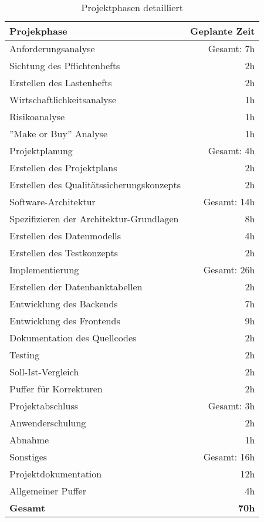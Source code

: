 \label{app:projektphasen_detail}
\begin{table}[H]
	\centering
	\begin{tabular}{lr}

		\rowcolor{white!15}				
		\textbf{Projekphase} & \textbf{Geplante Zeit} \\\hline

		\rowcolor{MidnightBlue!25}
	    Anforderungsanalyse & Gesamt: 7h \\\hline
	    Sichtung des Pflichtenhefts & 2h \\	    
	    Erstellen des Lastenhefts & 2h \\	    
	    Wirtschaftlichkeitsanalyse & 1h \\	     
	    Risikoanalyse & 1h \\	      
	    ''Make or Buy'' Analyse & 1h \\	    

	    \rowcolor{MidnightBlue!25}
	    Projektplanung & Gesamt: 4h \\\hline
	    Erstellen des Projektplans & 2h \\
		Erstellen des Qualitätssicherungskonzepts & 2h \\
		
		\rowcolor{MidnightBlue!25}
	    Software-Architektur & Gesamt: 14h \\\hline
	    Spezifizieren der Architektur-Grundlagen & 8h \\
		Erstellen des Datenmodells & 4h \\
		Erstellen des Testkonzepts & 2h \\
		
		\rowcolor{MidnightBlue!25}
	    Implementierung & Gesamt: 26h \\\hline
	    Erstellen der Datenbanktabellen & 2h \\
		Entwicklung des Backends & 7h \\
		Entwicklung des Frontends & 9h \\
		Dokumentation des Quellcodes & 2h \\
	    Testing & 2h \\
		Soll-Ist-Vergleich & 2h \\
		Puffer für Korrekturen & 2h \\
		
		\rowcolor{MidnightBlue!25}
	    Projektabschluss & Gesamt: 3h \\\hline
	    Anwenderschulung & 2h \\
		Abnahme & 1h \\
		
		\rowcolor{MidnightBlue!25}
	    Sonstiges & Gesamt: 16h \\\hline
	    Projektdokumentation & 12h \\
		Allgemeiner Puffer & 4h \\\hline
		
		\textbf{Gesamt} & \textbf{70h}				
			    
	\end{tabular}
	\caption{Projektphasen detailliert}
	\label{tab:projektphasen_detail}
	\end{table}